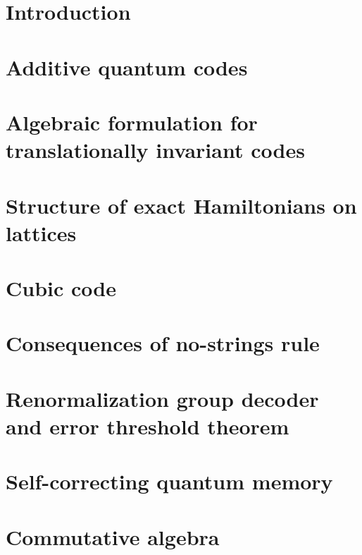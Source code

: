 \documentclass[letterpaper,10pt,defended]{cit_thesis}
\theoremstyle{definition} \newtheorem{defn}{Definition}[chapter]
\theoremstyle{definition} \newtheorem{rem}{Remark}[chapter]
\theoremstyle{definition} \newtheorem{example}{Example}[chapter]
\begin{document}
\mainmatter

\chapter{Introduction}



\chapter{Additive quantum codes}
\label{chap:additive-codes}


\chapter{Algebraic formulation for translationally invariant codes}
\label{chap:alg-theory}


\chapter{Structure of exact Hamiltonians on lattices}
\label{chap:lowD-codes}



\chapter{Cubic code}
\label{chap:cubic-code}


\chapter{Consequences of no-strings rule}
\label{chap:consq-no-strings}


\chapter{Renormalization group decoder and error threshold theorem}
\label{chap:RG-decoder}


\chapter{Self-correcting quantum memory}
\label{chap:q-mem}


\appendix

\chapter{Commutative algebra}
\label{app:algebra}



\end{document}
